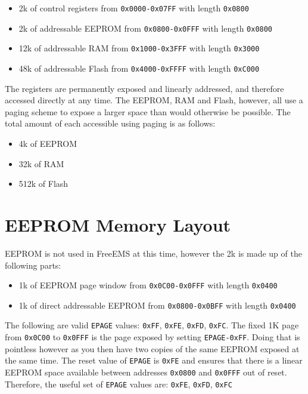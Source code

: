\documentclass[12pt,a4wide,titlepage]{article}
\begin{document}
\begin{itemize}
\item 2k of control registers from \texttt{0x0000-0x07FF} with length \texttt{0x0800}
\item 2k of addressable EEPROM from \texttt{0x0800-0x0FFF} with length \texttt{0x0800}
\item 12k of addressable RAM from \texttt{0x1000-0x3FFF} with length \texttt{0x3000}
\item 48k of addressable Flash from \texttt{0x4000-0xFFFF} with length \texttt{0xC000}
\end{itemize}

The registers are permanently exposed and linearly addressed, and therefore
accessed directly at any time. The EEPROM, RAM and Flash, however, all use a
paging scheme to expose a larger space than would otherwise be possible. The
total amount of each accessible using paging is as follows:

\begin{itemize}
\item 4k of EEPROM
\item 32k of RAM
\item 512k of Flash
\end{itemize}




\section{EEPROM Memory Layout}

EEPROM is not used in FreeEMS at this time, however the 2k is made up of the
following parts:

\begin{itemize}
\item 1k of EEPROM page window from \texttt{0x0C00-0x0FFF} with length \texttt{0x0400}
\item 1k of direct addressable EEPROM from \texttt{0x0800-0x0BFF} with length \texttt{0x0400}
\end{itemize}

The following are valid \texttt{EPAGE} values: \texttt{0xFF}, \texttt{0xFE},
\texttt{0xFD}, \texttt{0xFC}. The fixed 1K page from \texttt{0x0C00} to
\texttt{0x0FFF} is the page exposed by setting \texttt{EPAGE-0xFF}.
Doing that is pointless however as you then have two copies of the same EEPROM
exposed at the same time. The reset value of \texttt{EPAGE} is \texttt{0xFE}
and ensures that there is a linear EEPROM space available between addresses
\texttt{0x0800} and \texttt{0x0FFF} out of reset. Therefore, the useful set of
\texttt{EPAGE} values are: \texttt{0xFE}, \texttt{0xFD}, \texttt{0xFC}
\end{document}

